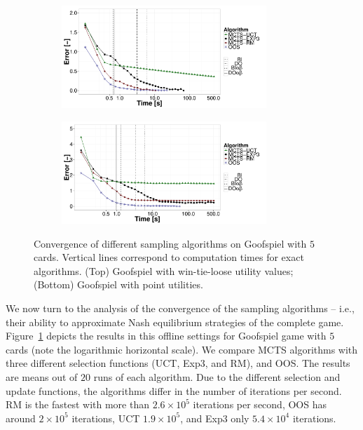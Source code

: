 \begin{figure}
	\begin{subfigure}{1\textwidth}
		\centering
		\includegraphics[width=0.85\textwidth]{figures/convergence-gs-tf.pdf}%
	\end{subfigure}
	\begin{subfigure}{1\textwidth}
		\centering
		\includegraphics[width=0.85\textwidth]{figures/convergence-gs-ff.pdf}%
	\end{subfigure}
\caption{Convergence of different sampling algorithms on Goofspiel with $5$ cards. 
Vertical lines correspond to computation times for exact algorithms.
(Top) Goofspiel with win-tie-loose utility values; 
(Bottom) Goofspiel with point utilities.} \label{fig:off:conv:gs}
\end{figure}

We now turn to the analysis of the convergence of the sampling algorithms -- i.e., their ability to approximate Nash equilibrium strategies of the complete game. 
Figure~\ref{fig:off:conv:gs} depicts the results in this offline settings for Goofspiel game with $5$ cards (note the logarithmic horizontal scale).
We compare MCTS algorithms with three different selection functions (UCT, Exp3, and RM), and OOS.
The results are means out of $20$ runs of each algorithm.
Due to the different selection and update functions, the algorithms differ in the number of iterations per second.
RM is the fastest with more than $2.6\times 10^5$ iterations per second, OOS has around $2\times10^5$ iterations, UCT $1.9\times10^5$, and Exp3 only $5.4\times10^4$ iterations.

